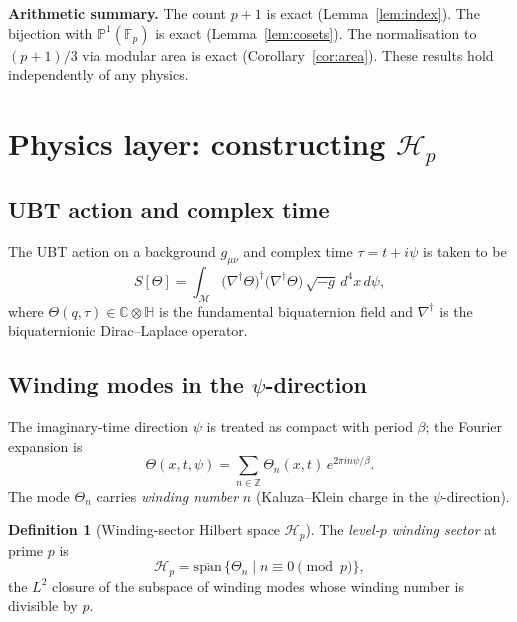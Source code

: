 \documentclass[12pt,a4paper]{article}
\theoremstyle{definition}
\newtheorem{definition}[theorem]{Definition}
\theoremstyle{remark}
\newcommand{\HH}{\mathbb{H}}       %
\newcommand{\CC}{\mathbb{C}}
\newcommand{\ZZ}{\mathbb{Z}}
\newcommand{\FF}{\mathbb{F}}
\newcommand{\PP}{\mathbb{P}}
\newcommand{\Hp}{\mathcal{H}_p}
\begin{document}
\begin{resultbox}
\textbf{Arithmetic summary.}  The count $p+1$ is exact (Lemma~\ref{lem:index}).
The bijection with $\PP^1(\FF_p)$ is exact (Lemma~\ref{lem:cosets}).
The normalisation to $(p+1)/3$ via modular area is exact
(Corollary~\ref{cor:area}).  These results hold independently of any
physics.
\end{resultbox}

\section{Physics layer: constructing $\mathcal{H}_p$}
\label{sec:hilbert}

\subsection{UBT action and complex time}

The UBT action on a background $g_{\mu\nu}$ and complex time
$\tau = t + i\psi$ is taken to be
\begin{equation}
  S[\Theta] = \int_{\mathcal{M}}
  \bigl(\nabla^\dagger\Theta\bigr)^\dagger
  \bigl(\nabla^\dagger\Theta\bigr)\,
  \sqrt{-g}\,d^4x\,d\psi,
  \label{eq:action}
\end{equation}
where $\Theta(q,\tau)\in\CC\otimes\HH$ is the fundamental biquaternion
field and $\nabla^\dagger$ is the biquaternionic Dirac--Laplace operator.

\subsection{Winding modes in the $\psi$-direction}

The imaginary-time direction $\psi$ is treated as compact with period
$\beta$; the Fourier expansion is
\begin{equation}
  \Theta(x,t,\psi) = \sum_{n\in\ZZ} \Theta_n(x,t)\,e^{2\pi i n\psi/\beta}.
  \label{eq:winding}
\end{equation}
The mode $\Theta_n$ carries \emph{winding number} $n$ (Kaluza--Klein
charge in the $\psi$-direction).

\begin{definition}[Winding-sector Hilbert space $\Hp$]
\label{def:Hp}
The \emph{level-$p$ winding sector} at prime $p$ is
\[
  \Hp = \overline{\mathrm{span}}\,\{\Theta_n \mid n\equiv 0\pmod{p}\},
\]
the $L^2$ closure of the subspace of winding modes whose winding number
is divisible by $p$.
\end{definition}
\end{document}
